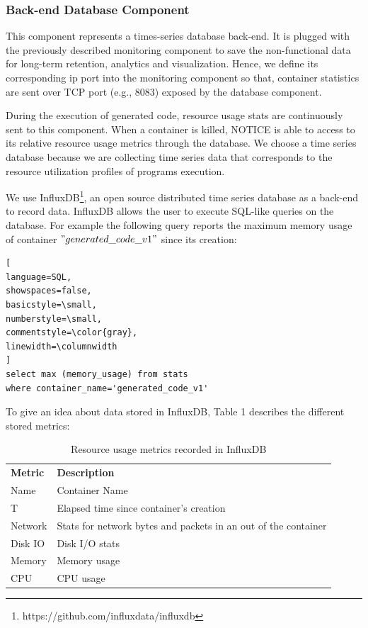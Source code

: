 \subsubsection{Back-end Database Component}
This component represents a times-series database back-end. It is plugged with the previously described monitoring component to save the non-functional data for long-term retention, analytics and visualization. Hence, we define its corresponding ip port into the monitoring component so that, container statistics are sent over TCP port (e.g., 8083) exposed by the database component.

During the execution of generated code, resource usage stats are continuously sent to this component. When a container is killed, NOTICE is able to access to its relative resource usage metrics through the database. We choose a time series database because we are collecting time series data that corresponds to the resource utilization profiles of programs execution.

We use InfluxDB\footnote{https://github.com/influxdata/influxdb}, an open source distributed time series database as a back-end to record data. InfluxDB allows the user to execute SQL-like queries on the database. For example the following query reports the maximum memory usage of container $"generated\_code\_v1"$ since its creation:

\begin{lstlisting}[
language=SQL,
showspaces=false,
basicstyle=\small,
numberstyle=\small,
commentstyle=\color{gray},
linewidth=\columnwidth
]
select max (memory_usage) from stats 
where container_name='generated_code_v1'
\end{lstlisting}
To give an idea about data stored in InfluxDB, Table 1 describes the different stored metrics:
 \begin{table}[h]
 	\begin{center}
 		\begin{tabular}{|p{1cm}|p{6.9cm}|}
 			\hline
 			 \textbf{Metric} & \textbf{Description} \\
 		\hhline{|=|=|}	
 			 Name & Container Name \\
 		
 			 T & Elapsed time since container's creation \\
 		
 			 Network &  Stats for network bytes and packets in an out of the container \\
 		
 			 Disk IO &  Disk I/O stats \\
 		
 			 Memory &  Memory usage \\
 			
 		   	 CPU &  CPU usage \\
 			\hline
 			
 		\end{tabular}
 		
 	\end{center}
 	\caption {Resource usage metrics recorded in InfluxDB}
 \end{table}
 
